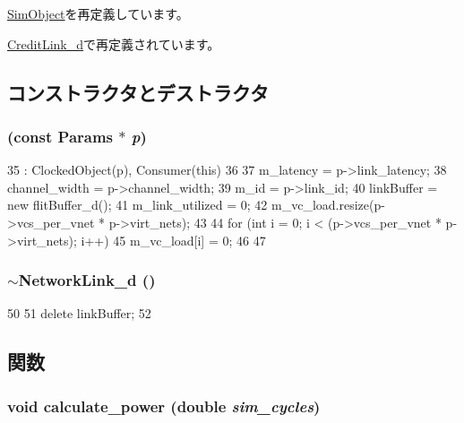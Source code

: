 \hyperlink{classSimObject_a0f0761d2db586a23bb2a2880b8f387bb}{SimObject}を再定義しています。

\hyperlink{classCreditLink__d_a5869b5dc6fac750f04b868a201484100}{CreditLink\_\-d}で再定義されています。

\subsection{コンストラクタとデストラクタ}
\hypertarget{classNetworkLink__d_ad6f3b9635c28c2ba4852a7ccd83044bf}{
\subsubsection[{NetworkLink\_\-d}]{ (const {\bf Params} $\ast$ {\em p})}}
\label{classNetworkLink__d_ad6f3b9635c28c2ba4852a7ccd83044bf}



\begin{DoxyCode}
35     : ClockedObject(p), Consumer(this)
36 {
37     m_latency = p->link_latency;
38     channel_width = p->channel_width;
39     m_id = p->link_id;
40     linkBuffer = new flitBuffer_d();
41     m_link_utilized = 0;
42     m_vc_load.resize(p->vcs_per_vnet * p->virt_nets);
43 
44     for (int i = 0; i < (p->vcs_per_vnet * p->virt_nets); i++) {
45         m_vc_load[i] = 0;
46     }
47 }
\end{DoxyCode}
\hypertarget{classNetworkLink__d_a2e51acea4c9f96234486b987d7eeaba4}{
\subsubsection[{$\sim$NetworkLink\_\-d}]{\setlength{\rightskip}{0pt plus 5cm}$\sim${\bf NetworkLink\_\-d} ()}}
\label{classNetworkLink__d_a2e51acea4c9f96234486b987d7eeaba4}



\begin{DoxyCode}
50 {
51     delete linkBuffer;
52 }
\end{DoxyCode}


\subsection{関数}
\hypertarget{classNetworkLink__d_a9f658913fdb0d349f8b713bf7e878ddf}{
\subsubsection[{calculate\_\-power}]{\setlength{\rightskip}{0pt plus 5cm}void calculate\_\-power (double {\em sim\_\-cycles})}}
\label{classNetworkLink__d_a9f658913fdb0d349f8b713bf7e878ddf}



